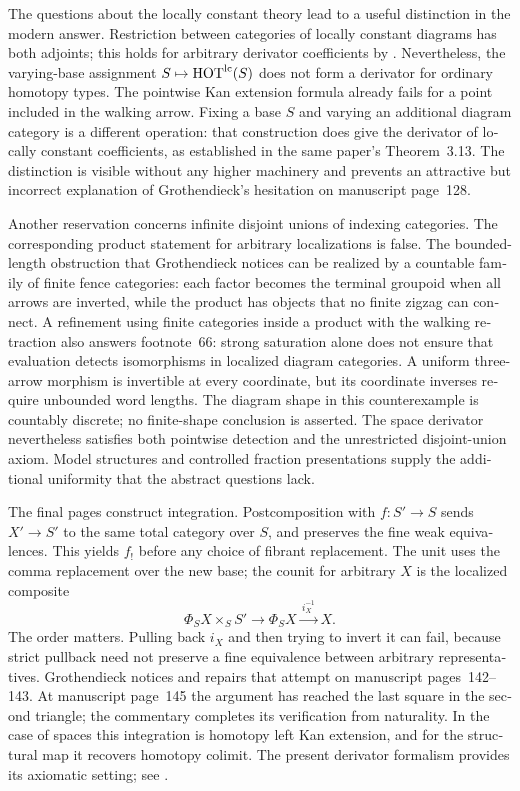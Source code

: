 \begin{otherlanguage}{english}
The questions about the locally constant theory lead to a useful distinction in the modern answer. Restriction between categories of locally constant diagrams has both adjoints; this holds for arbitrary derivator coefficients by \citet[Corollary~3.11]{Cisinski2009LocallyConstant}. Nevertheless, the varying-base assignment $S\mapsto\mathrm{HOT}^{\mathrm{lc}}(S)$ does not form a derivator for ordinary homotopy types. The pointwise Kan extension formula already fails for a point included in the walking arrow. Fixing a base $S$ and varying an additional diagram category is a different operation: that construction does give the derivator of locally constant coefficients, as established in the same paper's Theorem~3.13. The distinction is visible without any higher machinery and prevents an attractive but incorrect explanation of Grothendieck's hesitation on manuscript page~128.

Another reservation concerns infinite disjoint unions of indexing categories. The corresponding product statement for arbitrary localizations is false. The bounded-length obstruction that Grothendieck notices can be realized by a countable family of finite fence categories: each factor becomes the terminal groupoid when all arrows are inverted, while the product has objects that no finite zigzag can connect. A refinement using finite categories inside a product with the walking retraction also answers footnote~66: strong saturation alone does not ensure that evaluation detects isomorphisms in localized diagram categories. A uniform three-arrow morphism is invertible at every coordinate, but its coordinate inverses require unbounded word lengths. The diagram shape in this counterexample is countably discrete; no finite-shape conclusion is asserted. The space derivator nevertheless satisfies both pointwise detection and the unrestricted disjoint-union axiom. Model structures and controlled fraction presentations supply the additional uniformity that the abstract questions lack.

The final pages construct integration. Postcomposition with $f:S'\to S$ sends $X'\to S'$ to the same total category over $S$, and preserves the fine weak equivalences. This yields $f_!$ before any choice of fibrant replacement. The unit uses the comma replacement over the new base; the counit for arbitrary $X$ is the localized composite
\[
\Phi_SX\times_S S'\longrightarrow\Phi_SX
  \xrightarrow{\,i_X^{-1}\,}X.
\]
The order matters. Pulling back $i_X$ and then trying to invert it can fail, because strict pullback need not preserve a fine equivalence between arbitrary representatives. Grothendieck notices and repairs that attempt on manuscript pages~142--143. At manuscript page~145 the argument has reached the last square in the second triangle; the commentary completes its verification from naturality. In the case of spaces this integration is homotopy left Kan extension, and for the structural map it recovers homotopy colimit. The present derivator formalism provides its axiomatic setting; see \citet{Groth2013}.


\end{otherlanguage}
